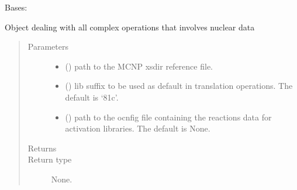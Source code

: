 \documentclass[letterpaper,10pt,english]{sphinxmanual}
\begin{document}
\begin{fulllineitems}
\label{\detokenize{api/initobjects:libmanager.LibManager}}
Bases: 

Object dealing with all complex operations that involves nuclear data
\begin{quote}\begin{description}
\item[{Parameters}] \leavevmode\begin{itemize}
\item {} 
 () \textendash{} path to the MCNP xsdir reference file.

\item {} 
 (\sphinxstyleliteralemphasis{\sphinxupquote{, }}) \textendash{} lib suffix to be used as default in translation operations.
The default is ‘81c’.

\item {} 
 (\sphinxstyleliteralemphasis{\sphinxupquote{, }}) \textendash{} path to the ocnfig file containing the reactions data for
activation libraries. The default is None.

\end{itemize}

\item[{Returns}] \leavevmode


\item[{Return type}] \leavevmode
None.

\end{description}\end{quote}


\end{fulllineitems}
\end{document}
